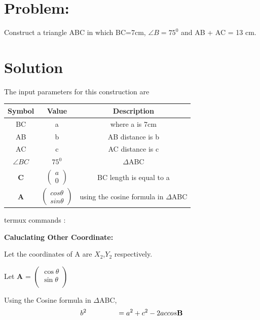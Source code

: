 \documentclass[10pt,a4paper]{report}
\newcommand{\myvec}[1]{\ensuremath{\begin{pmatrix}#1\end{pmatrix}}}
\let\vec\mathbf
\begin{document}
\begin{multicols}{2}
\section{Problem:}  Construct a triangle ABC in which BC=7cm, $\angle{B}=75^0$ and AB + AC = 13 cm.\vspace{3mm}
\section{Solution}
The input parameters for this construction are
\begin{center}
\begin{tabular}{|c|c|c|}
	\hline
	\textbf{Symbol}&\textbf{Value}&\textbf{Description}\\
	\hline
	BC & a & where a is 7cm\\
	\hline
	AB & b & AB distance is b \\
	\hline 
	AC & c & AC distance is c \\
	\hline
	$\angle{BC}$ & $75^0$ &  $\Delta$ABC \\
	\hline
	$\vec{C}$ & $\myvec{a\\0}$ & BC length is equal to a\\
	\hline
	$\vec{A}$ & $\myvec{ cos\theta \\ sin\theta}$ & using the cosine formula in $\Delta$ABC\\
	\hline
\end{tabular}
\end{center}
\raggedright {termux commands :}
\begin{center}
\end{center}
\raggedright\textbf{Caluclating Other Coordinate: } \\
\raggedright Let the coordinates of A are $X_{2}$,$Y_{2}$ respectively. \\
  \raggedright Let \textbf{A} =
  $\begin{pmatrix} 
 \cos \theta\\
  \sin\theta \\
\end{pmatrix}$ \\
\raggedright Using the Cosine formula in  $\Delta$ABC, \\ \vspace{3mm}
\begin{equation}
{b}^2\hspace{1.5cm}= {a}^2 + {c}^2 - 2accos\vec{B}
\end{equation}

\end{multicols}
\end{document}
